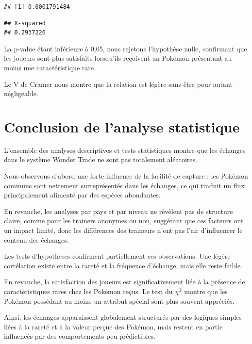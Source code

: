 \documentclass[mstat,12pt]{unswthesis}
\begin{document}
\bigskip

\begin{verbatim}
## [1] 0.0001791484
\end{verbatim}

\begin{verbatim}
## X-squared 
## 0.2937226
\end{verbatim}

\bigskip

La p-value étant inférieure à 0,05, nous rejetons l'hypothèse nulle,
confirmant que les joueurs sont plus satisfaits lorsqu'ils reçoivent un
Pokémon présentant au moins une caractéristique rare.

Le V de Cramer nous montre que la relation est légère sans être pour
autant négligeable.

\bigskip
\bigskip

\section{Conclusion de l'analyse
statistique}\label{conclusion-de-lanalyse-statistique}

L'ensemble des analyses descriptives et tests statistiques montre que
les échanges dans le système Wonder Trade ne sont pas totalement
aléatoires.

\bigskip

Nous observons d'abord une forte influence de la facilité de capture :
les Pokémon communs sont nettement surreprésentés dans les échanges, ce
qui traduit un flux principalement alimenté par des espèces abondantes.

En revanche, les analyses par pays et par niveau ne révèlent pas de
structure claire, comme pour les trainers anonymes ou non, suggérant que
ces facteurs ont un impact limité, donc les différences des traineurs
n'ont pas l'air d'influencer le contenu des échanges.

\bigskip

Les tests d'hypothèses confirment partiellement ces observations. Une
légère corrélation existe entre la rareté et la fréquence d'échange,
mais elle reste faible.

En revanche, la satisfaction des joueurs est significativement liée à la
présence de caractéristiques rares chez les Pokémon reçus. Le test du
\(\chi^2\) montre que les Pokémon possédant au moins un attribut spécial
sont plus souvent appréciés.

\bigskip

Ainsi, les échanges apparaissent globalement structurés par des logiques
simples liées à la rareté et à la valeur perçue des Pokémon, mais
restent en partie influencés par des comportements peu prédictibles.
\end{document}
